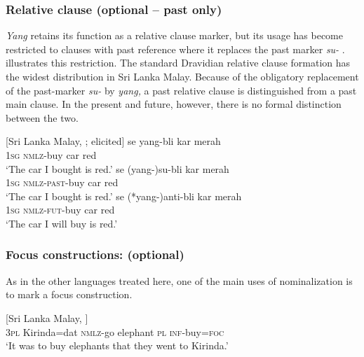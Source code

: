 \subsubsection{Relative clause (optional -- past only)}%

\textit{Yang} retains its function as a relative clause marker, but its usage has become restricted to clauses with past reference where it replaces the past marker \textit{su-} \citep[For further details, see][]{BourdinEtAl2010}.  illustrates this restriction. The standard Dravidian relative clause formation has the widest distribution in Sri Lanka Malay. Because of the obligatory replacement of the past-marker \textit{su- }by \textit{yang, }a past relative clause is distinguished from a past main clause. In the present and future, however, there is no formal distinction between the two.

\ea\label{smith:ex:70}
{}[Sri Lanka Malay, \citet[2-3]{BourdinEtAl2010};\footnotemark{} elicited]
\ea
\gll se yang-b{\textschwa}li kar merah\\ 
1\textsc{sg} \textsc{nmlz}-buy car red\\
`The car I bought is red.'
\ex
\gll *se (yang-)su-b{\textschwa}li kar merah\\
1\textsc{sg} \textsc{nmlz}-\textsc{past}-buy car red\\
`The car I bought is red.'
\ex
\gll se (*yang-)anti-b{\textschwa}li kar merah\\
1\textsc{sg} \textsc{nmlz}-\textsc{fut}-buy car red\\
`The car I will buy is red.'
\z
\z 
{}


\subsubsection{Focus constructions: (optional)}%
As in the other languages treated here, one of the main uses of nominalization is to mark a focus construction. 

\ea\label{smith:ex:71}
{}[Sri Lanka Malay, \citet[5]{BourdinEtAl2010}]
\gll [derang Kirinda=nang yang-pi] [gaja pada mem-beli=jo]\\
3\textsc{pl} Kirinda=dat \textsc{nmlz}-go elephant \textsc{pl} \textsc{inf}-buy=\textsc{foc}\\
`It was to buy elephants that they went to Kirinda.'
\z

